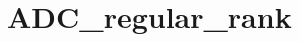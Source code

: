 \hypertarget{group___a_d_c__regular__rank}{\section{A\-D\-C\-\_\-regular\-\_\-rank}
\label{group___a_d_c__regular__rank}
}
